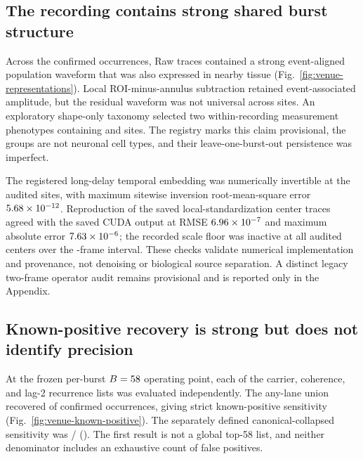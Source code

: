 \subsection{The recording contains strong shared burst structure}

Across the \VenueCohortOccurrences{} confirmed occurrences, Raw traces contained
a strong event-aligned population waveform that was also expressed in nearby
tissue (Fig.~\ref{fig:venue-representations}). Local ROI-minus-annulus
subtraction retained event-associated amplitude, but the residual waveform was
not universal across sites. An exploratory shape-only taxonomy selected two
within-recording measurement phenotypes containing
\VenueTraceClassOneSites{} and \VenueTraceClassTwoSites{} sites. The registry
marks this claim provisional, the groups are not neuronal cell types, and their
leave-one-burst-out persistence was imperfect.

The registered long-delay temporal embedding was numerically invertible at the
audited sites, with maximum sitewise inversion root-mean-square error
$5.68\times10^{-12}$. Reproduction of the saved local-standardization
center traces agreed with the saved CUDA output at RMSE $6.96\times10^{-7}$ and
maximum absolute error $7.63\times10^{-6}$; the recorded scale floor was inactive
at all \VenueCohortSites{} audited centers over the \VenueAuditFrames-frame
interval. These checks validate numerical implementation and provenance, not
denoising or biological source separation. A distinct legacy two-frame operator
audit remains provisional and is reported only in the Appendix.

\subsection{Known-positive recovery is strong but does not identify precision}

At the frozen per-burst \(B=58\) operating point, each of the
carrier, coherence, and lag-2 recurrence lists was evaluated independently. The
any-lane union recovered \VenueStrictRecovered{} of
\VenueCohortOccurrences{} confirmed occurrences, giving strict known-positive
sensitivity \VenueStrictSensitivity{} (Fig.~\ref{fig:venue-known-positive}).
The separately defined canonical-collapsed sensitivity was
\VenueCanonicalRecovered/\VenueCanonicalOccurrences{}
(\VenueCanonicalSensitivity). The first result is not a global top-58 list, and
neither denominator includes an exhaustive count of false positives.

